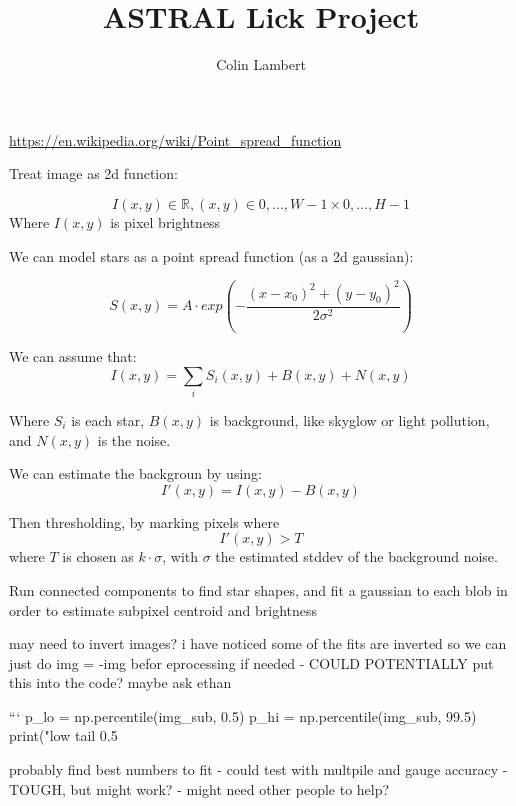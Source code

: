 \documentclass{article}
\title{ASTRAL Lick Project}
\author{Colin Lambert}
\date{Last Updated: 2025-\usepackage{hyperref}09-25 23:07}
\begin{document}
\maketitle

\url{https://en.wikipedia.org/wiki/Point_spread_function}

Treat image as 2d function:

\begin{equation}
    
    \label{eq:image}
    I(x,y) \in \mathbb{R}, (x,y) \in {0,...,W-1} \times {0,...,H-1}
\end{equation}
Where $ I(x,y) $ is pixel brightness


We can model stars as a point spread function (as a 2d gaussian):

\begin{equation}
    
    \label{eq:psf}
    S(x,y) = A\cdot exp(-\frac{(x-x_0)^2+(y-y_0)^2}{2\sigma^2})
\end{equation}


We can assume that:
\begin{equation}
    
    \label{eq:total}
    I(x,y) = \sum_i{S_i(x,y) + B(x,y) + N(x,y)}
\end{equation}

Where $S_i$ is each star, $B(x,y)$ is background, like skyglow or light pollution, and $N(x,y)$ is the noise.



We can estimate the backgroun by using:
\[ 
I\prime(x,y) = I(x,y) - B(x,y)
\]

Then thresholding, by marking pixels where 
\[
I\prime(x,y) > T
\]
where $T$ is chosen as $k\cdot\sigma$, with $\sigma$ the estimated stddev of the background noise. 

Run connected components to find star shapes, and fit a gaussian to each blob in order to estimate subpixel centroid and brightness



may need to invert images?
i have noticed some of the fits are inverted so we can just do img  = -img befor eprocessing if needed - COULD POTENTIALLY put this into the code? maybe ask ethan

``` 
p_lo = np.percentile(img_sub, 0.5)
p_hi = np.percentile(img_sub, 99.5)
print("low tail 0.5%


probably find best numbers to fit - could test with multpile and gauge accuracy - TOUGH, but might work? - might need other people to help?
\end{document}

